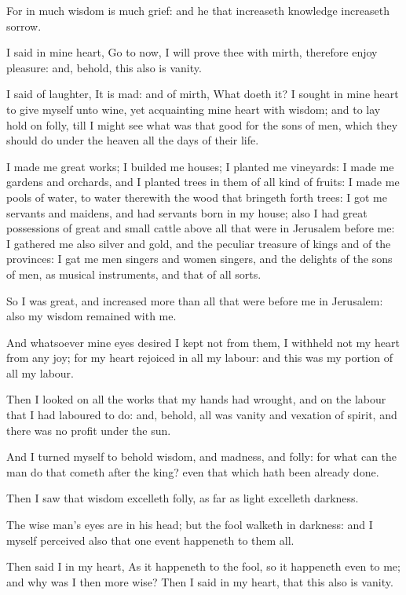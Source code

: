 \Verse For in much wisdom is much grief: and he that increaseth knowledge increaseth sorrow.


\Chapter
\Verse I said in mine heart, Go to now, I will prove thee with mirth, therefore enjoy pleasure: and, behold, this also is vanity.

\Verse I said of laughter, It is mad: and of mirth, What doeth it?  \Verse I sought in mine heart to give myself unto wine, yet acquainting mine heart with wisdom; and to lay hold on folly, till I might see what was that good for the sons of men, which they should do under the heaven all the days of their life.

\Verse I made me great works; I builded me houses; I planted me vineyards: \Verse I made me gardens and orchards, and I planted trees in them of all kind of fruits: \Verse I made me pools of water, to water therewith the wood that bringeth forth trees: \Verse I got me servants and maidens, and had servants born in my house; also I had great possessions of great and small cattle above all that were in Jerusalem before me: \Verse I gathered me also silver and gold, and the peculiar treasure of kings and of the provinces: I gat me men singers and women singers, and the delights of the sons of men, as musical instruments, and that of all sorts.

\Verse So I was great, and increased more than all that were before me in Jerusalem: also my wisdom remained with me.

\Verse And whatsoever mine eyes desired I kept not from them, I withheld not my heart from any joy; for my heart rejoiced in all my labour: and this was my portion of all my labour.

\Verse Then I looked on all the works that my hands had wrought, and on the labour that I had laboured to do: and, behold, all was vanity and vexation of spirit, and there was no profit under the sun.

\Verse And I turned myself to behold wisdom, and madness, and folly: for what can the man do that cometh after the king? even that which hath been already done.

\Verse Then I saw that wisdom excelleth folly, as far as light excelleth darkness.

\Verse The wise man's eyes are in his head; but the fool walketh in darkness: and I myself perceived also that one event happeneth to them all.

\Verse Then said I in my heart, As it happeneth to the fool, so it happeneth even to me; and why was I then more wise? Then I said in my heart, that this also is vanity.

